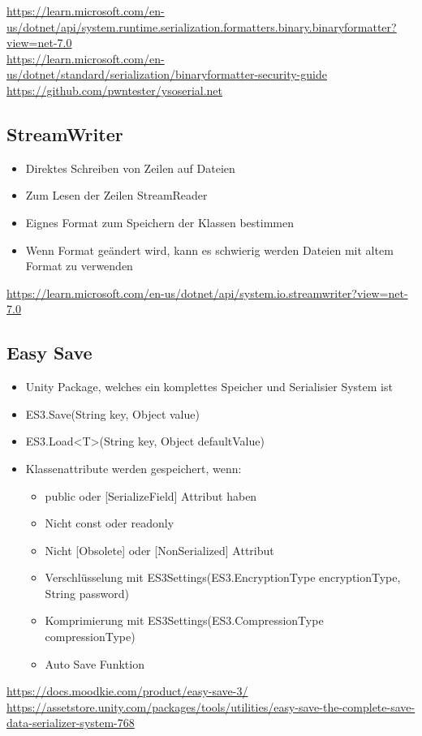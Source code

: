 \url{https://learn.microsoft.com/en-us/dotnet/api/system.runtime.serialization.formatters.binary.binaryformatter?view=net-7.0}\\
\url{https://learn.microsoft.com/en-us/dotnet/standard/serialization/binaryformatter-security-guide}\\
\url{https://github.com/pwntester/ysoserial.net}

\subsection{StreamWriter}
\begin{itemize}
    \item Direktes Schreiben von Zeilen auf Dateien 
    \item Zum Lesen der Zeilen StreamReader
    \item Eignes Format zum Speichern der Klassen bestimmen
    \item Wenn Format geändert wird, kann es schwierig werden Dateien mit altem Format zu verwenden
\end{itemize}

\url{https://learn.microsoft.com/en-us/dotnet/api/system.io.streamwriter?view=net-7.0}

\subsection{Easy Save}

\begin{itemize}
    \item Unity Package, welches ein komplettes Speicher und Serialisier System ist
    \item ES3.Save(String key, Object value)
    \item ES3.Load<T>(String key, Object defaultValue)
    \item Klassenattribute werden gespeichert, wenn:
    \begin{itemize}
        \item public oder [SerializeField] Attribut haben
        \item Nicht const oder readonly
        \item Nicht [Obsolete] oder [NonSerialized] Attribut
        \item Verschlüsselung mit ES3Settings(ES3.EncryptionType encryptionType, String password)
        \item Komprimierung mit ES3Settings(ES3.CompressionType compressionType)
        \item Auto Save Funktion
    \end{itemize}
\end{itemize}
\url{https://docs.moodkie.com/product/easy-save-3/}\\
\url{https://assetstore.unity.com/packages/tools/utilities/easy-save-the-complete-save-data-serializer-system-768}

